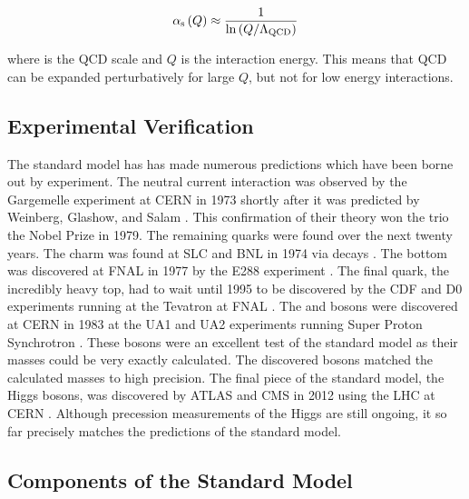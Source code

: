 \begin{equation}\label{eq:alpha_strong}
    \alpha_{\text{s}} \left( Q \right)
    \approx
    \frac{1}{
        {\mathrm{ln}} \left( Q / \Lambda_{\text{QCD}} \right)
    }
\end{equation}

where \LambdaQCD is the QCD scale and $Q$ is the interaction energy. This means
that QCD can be expanded perturbatively for large $Q$, but not for low energy
interactions.

\subsection{Experimental Verification}

The standard model has has made numerous predictions which have been borne out
by experiment. The neutral current interaction was observed by the Gargemelle
experiment at CERN in 1973 shortly after it was predicted by Weinberg, Glashow,
and Salam \cite{hasert1973}. This confirmation of their theory won the trio the
Nobel Prize in 1979. The remaining quarks were found over the next twenty
years. The charm was found at SLC and BNL in 1974 via \jpsi decays
\cite{aubert1974}\cite{augustin1974}. The bottom was discovered at FNAL in 1977
by the E288 experiment \cite{herb1977}. The final quark, the incredibly heavy
top, had to wait until 1995 to be discovered by the CDF and D0 experiments
running at the Tevatron at FNAL \cite{cdf1995}\cite{d01995}. The \W and \Z
bosons were discovered at CERN in 1983 at the UA1 and UA2 experiments running
Super Proton Synchrotron \cite{ua1_w}\cite{ua2_w}\cite{ua1_z}\cite{ua2_z}.
These bosons were an excellent test of the standard model as their masses could
be very exactly calculated. The discovered bosons matched the calculated masses
to high precision. The final piece of the standard model, the Higgs bosons, was
discovered by ATLAS and CMS in 2012 using the LHC at CERN
\cite{atlas_higgs}\cite{cms_higgs}. Although precession measurements of the
Higgs are still ongoing, it so far precisely matches the predictions of the
standard model.

\subsection{Components of the Standard Model}

